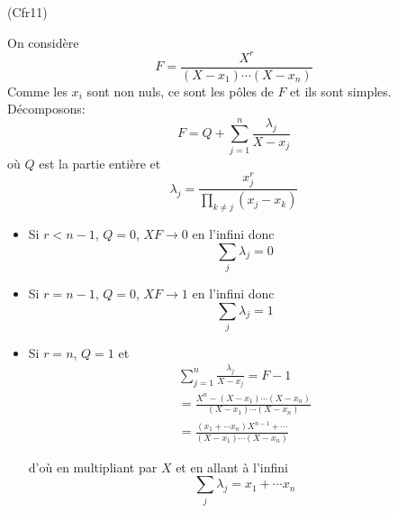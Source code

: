 \begin{tiny}(Cfr11)\end{tiny} On considère
\begin{displaymath}
  F = \frac{X^r}{(X-x_1)\cdots(X-x_n)}
\end{displaymath}
Comme les $x_i$ sont non nuls, ce sont les pôles de $F$ et ils sont simples. Décomposons: 
\begin{displaymath}
F = Q + \sum_{j=1}^n \frac{\lambda_j}{X-x_j}
\end{displaymath}
où $Q$ est la partie entière et 
\begin{displaymath}
  \lambda_j = \frac{x_j^r}{\prod_{k\neq j} (x_j - x_k)}
\end{displaymath}
\begin{itemize}
  \item Si $r<n-1$, $Q=0$, $XF \rightarrow 0$ en l'infini donc
  \begin{displaymath}
    \sum_j \lambda_j = 0
  \end{displaymath}
  \item Si $r=n-1$, $Q=0$, $XF \rightarrow 1$ en l'infini donc
  \begin{displaymath}
    \sum_j \lambda_j = 1
  \end{displaymath}
  \item Si $r=n$, $Q=1$ et
\begin{multline*}
\sum_{j=1}^n \frac{\lambda_j}{X-x_j} = F -1 \\
= \frac{X^n -(X-x_1)\cdots(X-x_n)}{(X-x_1)\cdots(X-x_n)}\\
= \frac{(x_1+\cdots x_n)X^{n-1} + \cdots }{(X-x_1)\cdots(X-x_n)}
\end{multline*}

d'où en multipliant par $X$ et en allant à l'infini
\begin{displaymath}
  \sum_j \lambda_j = x_1+\cdots x_n
\end{displaymath}

\end{itemize}
